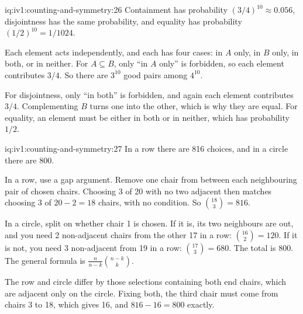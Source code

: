 \begin{solution}{iq:iv1:counting-and-symmetry:26}
Containment has probability $(3/4)^{10} \approx 0.056$, disjointness has the same probability, and equality has probability $(1/2)^{10} = 1/1024$.

Each element acts independently, and each has four cases: in $A$ only, in $B$ only, in both, or in neither. For $A \subseteq B$, only ``in $A$ only'' is forbidden, so each element contributes $3/4$. So there are $3^{10}$ good pairs among $4^{10}$.

For disjointness, only ``in both'' is forbidden, and again each element contributes $3/4$. Complementing $B$ turns one into the other, which is why they are equal. For equality, an element must be either in both or in neither, which has probability $1/2$.

\end{solution}

\enlargethispage{-3\baselineskip}%
\begin{solution}{iq:iv1:counting-and-symmetry:27}
In a row there are 816 choices, and in a circle there are 800.

In a row, use a gap argument. Remove one chair from between each neighbouring pair of chosen chairs. Choosing 3 of 20 with no two adjacent then matches choosing 3 of $20 - 2 = 18$ chairs, with no condition. So $\binom{18}{3} = 816$.

In a circle, split on whether chair 1 is chosen. If it is, its two neighbours are out, and you need 2 non-adjacent chairs from the other 17 in a row: $\binom{16}{2} = 120$. If it is not, you need 3 non-adjacent from 19 in a row: $\binom{17}{3} = 680$. The total is 800. The general formula is $\frac{n}{n-k}\binom{n-k}{k}$.

The row and circle differ by those selections containing both end chairs, which are adjacent only on the circle. Fixing both, the third chair must come from chairs 3 to 18, which gives 16, and $816 - 16 = 800$ exactly.

\end{solution}

